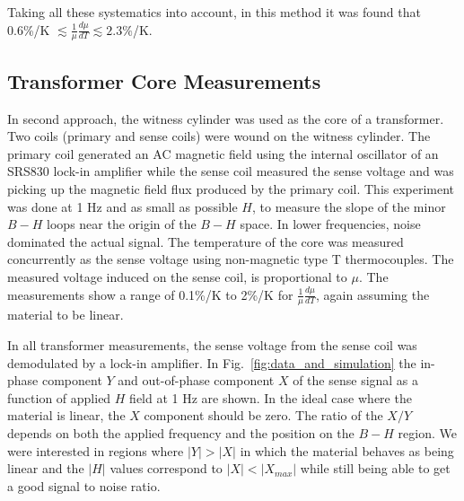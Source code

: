 \documentclass[review]{elsarticle}
\begin{document}



Taking all these systematics into account, in this method it was found that 0.6\%/K
$\lesssim\frac{1}{\mu}\frac{d\mu}{dT}\lesssim 2.3\%$/K. 




\subsection{Transformer Core Measurements}
In second approach, the witness cylinder was used as the core of a
transformer. Two coils (primary and sense coils) were wound on the
witness cylinder. The primary coil generated an AC magnetic field
using the internal oscillator of an SRS830 lock-in amplifier while the
sense coil measured the sense voltage and was picking up the magnetic
field flux produced by the primary coil. This experiment was done at 1
Hz and as small as possible $H$,
to measure the slope of the minor $B-H$ loops near the origin of the
$B-H$ space. In lower frequencies, noise dominated the actual signal.
The temperature of the core was measured concurrently as the sense
voltage using non-magnetic type T thermocouples.  The measured voltage
induced on the sense coil, is proportional to $\mu$.  The measurements
show a range of 0.1\%/K to 2\%/K for $\frac{1}{\mu}\frac{d\mu}{dT}$,
again assuming the material to be linear.

In all transformer measurements, the sense voltage from the sense coil
was demodulated by a lock-in amplifier. In
Fig.~\ref{fig:data_and_simulation} the in-phase component $Y$ and
out-of-phase component $X$ of the sense signal as a function of
applied $H$ field at 1 Hz are shown. In the ideal case where the
material is linear, the $X$ component should be zero. The ratio of the
$X/Y$ depends on both the applied frequency and the position on the
$B-H$ region. We were interested in regions where $\vert Y \vert >
\vert X \vert $ in which the material behaves as being linear and the
$\vert H \vert $ values correspond to $\vert X \vert < \vert X_{max}
\vert$ while still being able to get a good signal to noise ratio.
\end{document}
